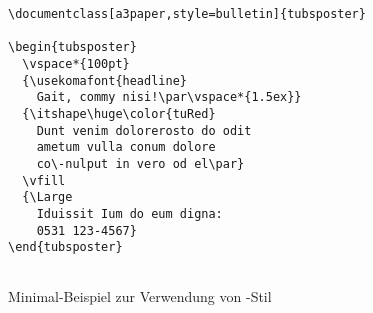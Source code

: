 \begin{figure}[!ht]
\begin{minipage}{0.65\textwidth}
\begin{lstlisting}
\documentclass[a3paper,style=bulletin]{tubsposter}

\begin{tubsposter}
  \vspace*{100pt}
  {\usekomafont{headline}
    Gait, commy nisi!\par\vspace*{1.5ex}}
  {\itshape\huge\color{tuRed}
    Dunt venim dolorerosto do odit
    ametum vulla conum dolore
    co\-nulput in vero od el\par}
  \vfill
  {\Large
    Iduissit Ium do eum digna:
    0531 123-4567}
\end{tubsposter}


\end{lstlisting}
\end{minipage}
\begin{minipage}{0.35\textwidth}
\end{minipage}
\caption{Minimal-Beispiel zur Verwendung von -Stil 
  }
\end{figure}


